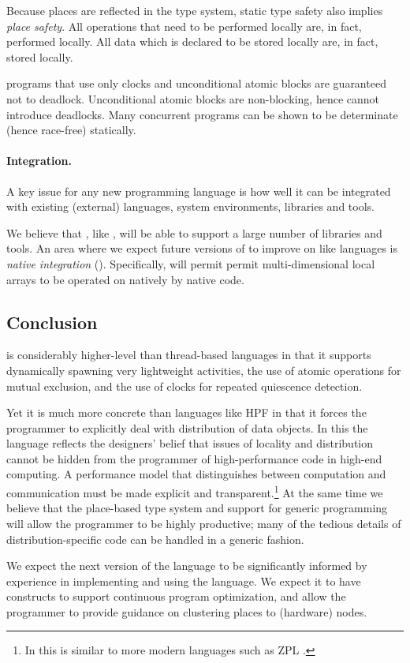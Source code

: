
Because places are reflected in the type system, static type safety
also implies \emph{place safety}. All operations that need to be performed
locally are, in fact, performed locally.  All data which is declared to be
stored locally are, in fact, stored locally.

\Xten{} programs that use only clocks and unconditional atomic
blocks are guaranteed not to deadlock. Unconditional atomic blocks
are non-blocking, hence cannot introduce deadlocks.
Many concurrent programs can be shown to be determinate (hence
race-free) statically.

\paragraph{Integration.}
A key issue for any new programming language is how well it can be
integrated with existing (external) languages, system environments,
libraries and tools.

We believe that \Xten{}, like \java{}, will be able to support a large
number of libraries and tools. An area where we expect future versions
of \Xten{} to improve on \java{} like languages is \emph{native
integration} (). Specifically, \Xten{} will permit
permit multi-dimensional local arrays to be operated on natively by
native code.

\subsection{Conclusion}
{}\Xten{} is considerably higher-level than thread-based languages in
that it supports dynamically spawning very lightweight activities, the
use of atomic operations for mutual exclusion, and the use of clocks
for repeated quiescence detection.

Yet it is much more concrete than languages like HPF in that it forces
the programmer to explicitly deal with distribution of data
objects. In this the language reflects the designers' belief that
issues of locality and distribution cannot be hidden from the
programmer of high-performance code in high-end computing.  A
performance model that distinguishes between computation and
communication must be made explicit and transparent.\footnote{In this
\Xten{} is similar to more modern languages such as ZPL \cite{zpl}.}
At the same time we believe that the place-based type system and
support for generic programming will allow the \Xten{} programmer to
be highly productive; many of the tedious details of
distribution-specific code can be handled in a generic fashion.

We expect the next version of the language to be significantly
informed by experience in implementing and using the language. We
expect it to have constructs to support continuous program
optimization, and allow the programmer to provide guidance on
clustering places to (hardware) nodes. 
